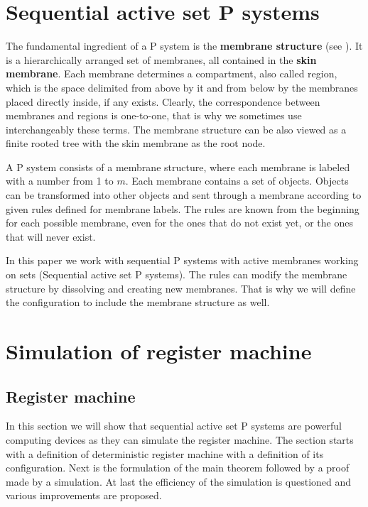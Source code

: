 \documentclass[submission,copyright,creativecommons]{../lib/lncs/llncs}
\begin{document}
  
\section{Sequential active set P systems}
\label{sec:p systems}


The fundamental ingredient of a P system is the {\bf membrane structure} (see \cite{Paun2006Introduction}). It is a hierarchically arranged set of membranes, all contained in the {\bf skin membrane}. Each membrane determines a compartment, also called region, which is the space delimited from above by it and from below by the membranes placed directly inside, if any exists. Clearly, the correspondence between membranes and regions is one-to-one, that is why we sometimes use interchangeably these terms.
The membrane structure can be also viewed as a finite rooted tree with the skin membrane as the root node.

A P system consists of a membrane structure, where each membrane is labeled with a number from 1 to $m$. Each membrane contains a set of objects. Objects can be transformed into other objects and sent through a membrane according to given rules defined for membrane labels. The rules are known from the beginning for each possible membrane, even for the ones that do not exist yet, or the ones that will never exist.

In this paper we work with sequential P systems with active membranes working on sets (Sequential active set P systems). The rules can modify the membrane structure by dissolving and creating new membranes. That is why we will define the configuration to include the membrane structure as well.




\section{Simulation of register machine} %
\label{sec:simulation_of_register_machine}

\subsection{Register machine} %
\label{sub:register_machine}

In this section we will show that sequential active set P systems are powerful computing devices as they can simulate the register machine. The section starts with a definition of deterministic register machine with a definition of its configuration. Next is the formulation of the main theorem followed by a proof made by a simulation. At last the efficiency of the simulation is questioned and various improvements are proposed. 
\end{document}
